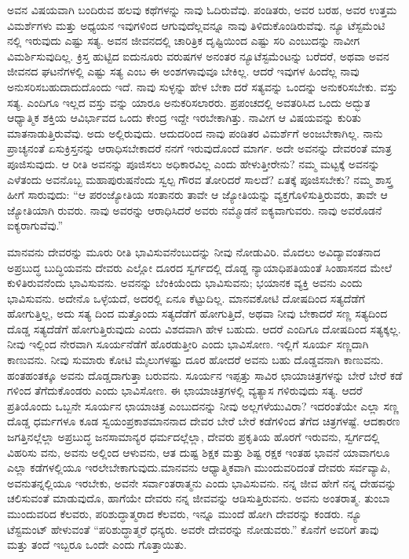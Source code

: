 ಅವನ ವಿಷಯವಾಗಿ ಬಂದಿರುವ ಹಲವು ಕಥೆಗಳನ್ನು ನಾವು ಓದಿರುವೆವು. ಪಂಡಿತರು, ಅವರ ಬರಹ, ಅವರ ಉತ್ತಮ ವಿಮರ್ಶೆಗಳು ಮತ್ತು ಅಧ್ಯಯನ ಇವುಗಳಿಂದ ಆಗುವುದೆಲ್ಲವನ್ನೂ ನಾವು ತಿಳಿದುಕೊಂಡಿರುವೆವು. ನ್ಯೂ ಟೆಸ್ಟಮೆಂಟಿ ನಲ್ಲಿ ಇರುವುದು ಎಷ್ಟು ಸತ್ಯ. ಅವನ ಜೀವನದಲ್ಲಿ ಚಾರಿತ್ರಿಕ ದೃಷ್ಟಿಯಿಂದ ಎಷ್ಟು ಸರಿ ಎಂಬುದನ್ನು ನಾವೀಗ ವಿಮರ್ಶಿಸುವುದಿಲ್ಲ. ಕ್ರಿಸ್ತ ಹುಟ್ಟಿದ ಐದುನೂರು ವರುಷಗಳ ಅನಂತರ ನ್ಯೂಟೆಸ್ಟಮೆಂಟನ್ನು ಬರೆದರೆ, ಅಥವಾ ಅವನ ಜೀವನದ ಘಟನೆಗಳಲ್ಲಿ ಎಷ್ಟು ಸತ್ಯ ಎಂಬ ಈ ಅಂಶಗಳಾವುವೂ ಬೇಕಿಲ್ಲ. ಆದರೆ ಇವುಗಳ ಹಿಂದೆಲ್ಲ ನಾವು ಅನುಸರಿಸಬಹುದಾದುದೊಂದು ಇದೆ. ನಾವು ಸುಳ್ಳನ್ನು ಹೇಳ ಬೇಕಾ ದರೆ ಸತ್ಯವನ್ನು ಒಂದನ್ನು ಅನುಕರಿಸಬೇಕು. ವಸ್ತು ಸತ್ಯ. ಎಂದಿಗೂ ಇಲ್ಲದ ವಸ್ತು ವನ್ನು ಯಾರೂ ಅನುಕರಿಸಲಾರರು. ಪ್ರಪಂಚದಲ್ಲಿ ಅವತರಿಸಿದ ಒಂದು ಅದ್ಭುತ ಆಧ್ಯಾತ್ಮಿಕ ಶಕ್ತಿಯ ಆವಿರ್ಭಾವದ ಒಂದು ಕೇಂದ್ರ ಇದ್ದೇ ಇರಬೇಕಾಗಿತ್ತು. ನಾವೀಗ ಆ ವಿಷಯವನ್ನು ಕುರಿತು ಮಾತನಾಡುತ್ತಿರುವೆವು. ಅದು ಅಲ್ಲಿರುವುದು. ಆದುದರಿಂದ ನಾವು ಪಂಡಿತರ ವಿಮರ್ಶೆಗೆ ಅಂಜಬೇಕಾಗಿಲ್ಲ. ನಾನು ಪ್ರಾಚ್ಯನಂತೆ ಏಸುಕ್ರಿಸ್ತನನ್ನು ಆರಾಧಿಸಬೇಕಾದರೆ ನನಗೆ ಇರುವುದೊಂದೆ ಮಾರ್ಗ. ಅದೇ ಅವನನ್ನು ದೇವರಂತೆ ಮಾತ್ರ ಪೂಜಿಸುವುದು. ಆ ರೀತಿ ಅವನನ್ನು ಪೂಜಿಸಲು ಅಧಿಕಾರವಿಲ್ಲ ಎಂದು ಹೇಳುತ್ತೀರೇನು? ನಮ್ಮ ಮಟ್ಟಕ್ಕೆ ಅವನನ್ನು ಎಳೆತಂದು ಅವನೊಬ್ಬ ಮಹಾಪುರುಷನೆಂದು ಸ್ವಲ್ಪ ಗೌರವ ತೋರಿದರೆ ಸಾಲದೆ? ಏತಕ್ಕೆ ಪೂಜಿಸಬೇಕು? ನಮ್ಮ ಶಾಸ್ತ್ರ ಹೀಗೆ ಸಾರುವುದು: “ಆ ಪರಂಜ್ಯೋತಿಯ ಸಂತಾನರು ತಾವೇ ಆ ಜ್ಯೋತಿಯನ್ನು ವ್ಯಕ್ತಗೊಳಿಸುತ್ತಿರುವರು, ತಾವೇ ಆ ಜ್ಯೋತಿಯಾಗಿ ರುವರು. ನಾವು ಅವರನ್ನು ಆರಾಧಿಸಿದರೆ ಅವರು ನಮ್ಮೊಡನೆ ಐಕ್ಯವಾಗುವರು. ನಾವು ಅವರೊಡನೆ ಐಕ್ಯರಾಗುವೆವು.”

ಮಾನವನು ದೇವರನ್ನು ಮೂರು ರೀತಿ ಭಾವಿಸುವನೆಂಬುದನ್ನು ನೀವು ನೋಡುವಿರಿ. ಮೊದಲು ಅವಿದ್ಯಾವಂತನಾದ ಅಪ್ರಬುದ್ಧ ಬುದ್ಧಿಯವನು ದೇವರು ಎಲ್ಲೋ ದೂರದ ಸ್ವರ್ಗದಲ್ಲಿ ದೊಡ್ಡ ನ್ಯಾಯಾಧಿಪತಿಯಂತೆ ಸಿಂಹಾಸನದ ಮೇಲೆ ಕುಳಿತಿರುವನೆಂದು ಭಾವಿಸುವನು. ಅವನನ್ನು ಬೆಂಕಿಯೆಂದು ಭಾವಿಸುವನು; ಭಯಾನಕ ವ್ಯಕ್ತಿ ಅವನು ಎಂದು ಭಾವಿಸುವನು. ಅದೇನೊ ಒಳ್ಳೆಯದೆ, ಅದರಲ್ಲಿ ಏನೂ ಕೆಟ್ಟುದಿಲ್ಲ. ಮಾನವಕೋಟಿ ದೋಷದಿಂದ ಸತ್ಯದೆಡೆಗೆ ಹೋಗುತ್ತಿಲ್ಲ, ಅದು ಸತ್ಯ ದಿಂದ ಮತ್ತೊಂದು ಸತ್ಯದೆಡೆಗೆ ಹೋಗುತ್ತಿದೆ, ಅಥವಾ ನೀವು ಬೇಕಾದರೆ ಸಣ್ಣ ಸತ್ಯದಿಂದ ದೊಡ್ಡ ಸತ್ಯದೆಡೆಗೆ ಹೋಗುತ್ತಿರುವುದು ಎಂದು ವಿಶದವಾಗಿ ಹೇಳ ಬಹುದು. ಆದರೆ ಎಂದಿಗೂ ದೋಷದಿಂದ ಸತ್ಯಕ್ಕಲ್ಲ. ನೀವು ಇಲ್ಲಿಂದ ನೇರವಾಗಿ ಸೂರ್ಯನೆಡೆಗೆ ಹೊರಡುತ್ತೀರಿ ಎಂದು ಭಾವಿಸೋಣ. ಇಲ್ಲಿಗೆ ಸೂರ್ಯ ಸಣ್ಣದಾಗಿ ಕಾಣುವನು. ನೀವು ಸುಮಾರು ಕೋಟಿ ಮೈಲುಗಳಷ್ಟು ದೂರ ಹೋದರೆ ಅವನು ಬಹು ದೊಡ್ಡವನಾಗಿ ಕಾಣುವನು. ಹಂತಹಂತಕ್ಕೂ ಅವನು ದೊಡ್ಡದಾಗುತ್ತಾ ಬರುವನು. ಸೂರ್ಯನ ಇಪ್ಪತ್ತು ಸಾವಿರ ಛಾಯಾಚಿತ್ರಗಳನ್ನು ಬೇರೆ ಬೇರೆ ಕಡೆ ಗಳಿಂದ ತೆಗೆದುಕೊಂಡರು ಎಂದು ಭಾವಿಸೋಣ. ಈ ಛಾಯಾಚಿತ್ರಗಳಲ್ಲಿ ವ್ಯತ್ಯಾಸ ಗಳಿರುವುದು ಸತ್ಯ. ಆದರೆ ಪ್ರತಿಯೊಂದು ಒಬ್ಬನೇ ಸೂರ್ಯನ ಛಾಯಾಚಿತ್ರ ಎಂಬುದನನ್ನು ನೀವು ಅಲ್ಲಗಳೆಯುವಿರಾ? ಇದರಂತೆಯೇ ಎಲ್ಲಾ ಸಣ್ಣ ದೊಡ್ಡ ಧರ್ಮಗಳೂ ಕೂಡ ಸ್ವಯಂಪ್ರಕಾಶಮಾನನಾದ ದೇವರ ಬೇರೆ ಬೇರೆ ಕಡೆಗಳಿಂದ ತೆಗೆದ ಚಿತ್ರಗಳಷ್ಟೆ. ಆದಕಾರಣ ಜಗತ್ತಿನಲ್ಲೆಲ್ಲಾ ಅಪ್ರಬುದ್ಧ ಜನಸಾಮಾನ್ಯರ ಧರ್ಮದಲ್ಲೆಲ್ಲಾ, ದೇವರು ಪ್ರಕೃತಿಯ ಹೊರಗೆ ಇರುವನು, ಸ್ವರ್ಗದಲ್ಲಿ ವಿಹರಿಸು ವನು, ಅವನು ಅಲ್ಲಿಂದ ಆಳುವನು, ಆತ ದುಷ್ಟ ಶಿಕ್ಷಕ ಮತ್ತು ಶಿಷ್ಟ ರಕ್ಷಕ ಇಂತಹ ಭಾವನೆ ಯಾವಾಗಲೂ ಎಲ್ಲಾ ಕಡೆಗಳಲ್ಲಿಯೂ ಇರಲೇಬೇಕಾಗುವುದು.\break ಮಾನವನು ಆಧ್ಯಾತ್ಮಿಕವಾಗಿ ಮುಂದುವರಿದಂತೆ ದೇವರು ಸರ್ವವ್ಯಾಪಿ, ಅವನು\break ತನ್ನಲ್ಲಿಯೂ ಇರಬೇಕು, ಅವನೇ ಸರ್ವಾಂತರಾತ್ಮನು ಎಂದು ಭಾವಿಸುವನು. ನನ್ನ ಜೀವ ಹೇಗೆ ನನ್ನ ದೇಹವನ್ನು ಚಲಿಸುವಂತೆ ಮಾಡುವುದೊ, ಹಾಗೆಯೇ ದೇವರು ನನ್ನ ಜೀವವನ್ನು ಆಡಿಸುತ್ತಿರುವನು. ಅವನು ಅಂತರಾತ್ಮ. ತುಂಬಾ ಮುಂದುವರಿದ ಕೆಲವರು, ಪರಿಶುದ್ಧಾತ್ಮರಾದ ಕೆಲವರು, ಇನ್ನೂ ಮುಂದೆ ಹೋಗಿ ದೇವರನ್ನು ಕಂಡರು. ನ್ಯೂ ಟೆಸ್ಟಮಂಟ್​ ಹೇಳುವಂತೆ “ಪರಿಶುದ್ಧಾತ್ಮರೆ ಧನ್ಯರು. ಅವರೇ ದೇವರನ್ನು ನೋಡುವರು.” ಕೊನೆಗೆ ಅವರಿಗೆ ತಾವು ಮತ್ತು ತಂದೆ ಇಬ್ಬರೂ ಒಂದೇ ಎಂದು ಗೊತ್ತಾಯಿತು.

